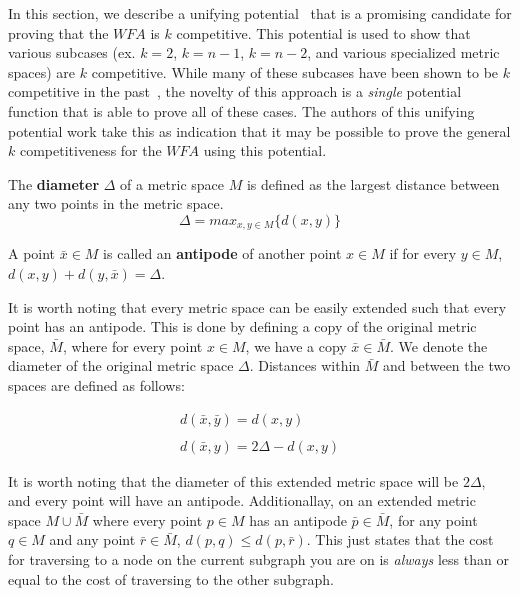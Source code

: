 In this section, we describe a unifying potential~\cite{unifyingPotential2021} that is a promising candidate for proving that the $WFA$ is $k$ competitive. This potential is used to show that various subcases (ex. $k=2$, $k=n-1$, $k=n-2$, and various specialized metric spaces) are $k$ competitive. While many of these subcases have been shown to be $k$ competitive in the past~\cite{server1991, server2009, server1996, server2004, server2002}, the novelty of this approach is a \textit{single} potential function that is able to prove all of these cases. The authors of this unifying potential work take this as indication that it may be possible to prove the general $k$ competitiveness for the $WFA$ using this potential.

\begin{definition}
    The \textbf{diameter} $\Delta$ of a metric space $M$ is defined as the largest distance between any two points in the metric space.
    \begin{equation*}
        \Delta = max_{x, y \in M} \{ d(x,y)\}
    \end{equation*}
\end{definition}

\begin{definition}
    A point $\bar{x} \in M$ is called an \textbf{antipode} of another point $x \in M$ if for every $y \in M$, $d(x,y) + d(y, \bar{x}) = \Delta$.
\end{definition}

It is worth noting that every metric space can be easily extended such that every point has an antipode. This is done by defining a copy of the original metric space, $\bar{M}$, where for every point $x \in M$, we have a copy $\bar{x} \in \bar{M}$. We denote the diameter of the original metric space $\Delta$. Distances within $\bar{M}$ and between the two spaces are defined as follows:

\begin{equation*}
    \begin{gathered}
        d(\bar{x}, \bar{y}) = d(x,y)\\ \\
        d(\bar{x}, y) = 2\Delta - d(x,y)
    \end{gathered}
\end{equation*}

It is worth noting that the diameter of this extended metric space will be $2\Delta$, and every point will have an antipode. Additionallay, on an extended metric space $M \cup \bar{M}$ where every point $p \in M$ has an antipode $\bar{p} \in \bar{M}$, for any point $q \in M$ and any point $\bar{r} \in \bar{M}$, $d(p,q) \leq d(p,\bar{r})$. This just states that the cost for traversing to a node on the current subgraph you are on is \textit{always} less than or equal to the cost of traversing to the other subgraph.

